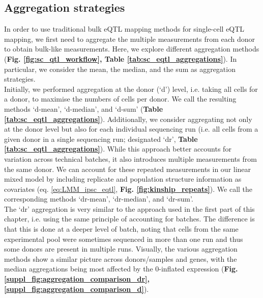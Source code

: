 \newpage

\subsection{Aggregation strategies}


In order to use traditional bulk eQTL mapping methods for single-cell eQTL mapping, we first need to aggregate the multiple measurements from each donor to obtain bulk-like measurements. 
Here, we explore different aggregation methods (\textbf{Fig. \ref{fig:sc_qtl_workflow}, Table \ref{tab:sc_eqtl_aggregations}}). 
In particular, we consider the mean, the median, and the sum as aggregation strategies. \\

Initially, we performed aggregation at the donor (`d') level, i.e. taking all cells for a donor, to maximise the numbers of cells per donor. 
We call the resulting methods `d-mean', `d-median', and `d-sum' (\textbf{Table \ref{tab:sc_eqtl_aggregations}}).
Additionally, we consider aggregating not only at the donor level but also for each individual sequencing run (i.e. all cells from a given donor in a single sequencing run; designated `dr', \textbf{Table \ref{tab:sc_eqtl_aggregations}}). 
While this approach better accounts for variation across technical batches, it also introduces multiple measurements from the same donor. 
We can account for these repeated measurements in our linear mixed model by including replicate and population structure information as covariates (eq. \eqref{eq:LMM_ipsc_eqtl}, \textbf{Fig. \ref{fig:kinship_repeats}}). 
We call the corresponding methods `dr-mean', `dr-median', and `dr-sum'. \\


The `dr' aggregation is very similar to the approach used in the first part of this chapter, i.e. using the same principle of accounting for batches.
The difference is that this is done at a deeper level of batch, noting that cells from the same experimental pool were sometimes sequenced in more than one run and thus some donors are present in multiple runs. 
Visually, the various aggregation methods show a similar picture across donors/samples and genes, with the median aggregations being most affected by the 0-inflated expression (\textbf{Fig. \ref{suppl_fig:aggregation_comparison_dr}, \ref{suppl_fig:aggregation_comparison_d}}). \\

